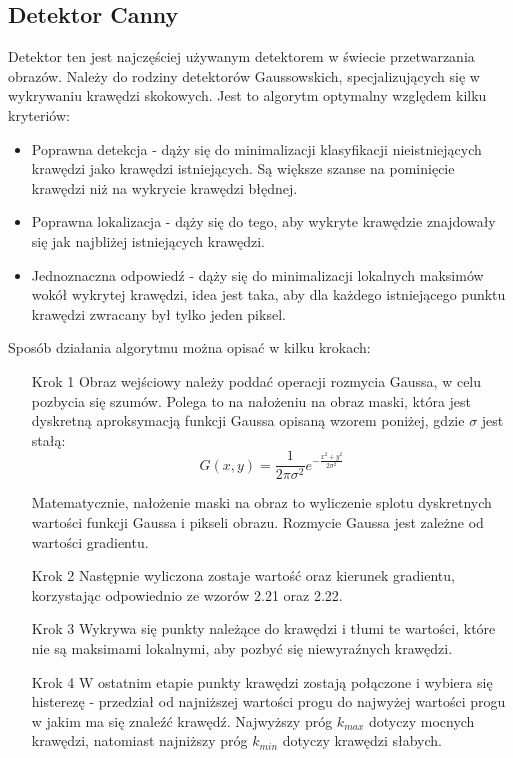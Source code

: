\documentclass[eng,oneside]{mgr}
\begin{document}
\subsection{Detektor Canny}
Detektor ten jest najczęściej używanym detektorem w świecie przetwarzania obrazów. Należy do rodziny detektorów Gaussowskich, specjalizujących się w wykrywaniu krawędzi skokowych. Jest to algorytm optymalny względem kilku kryteriów:
\begin{itemize}
\item Poprawna detekcja - dąży się do minimalizacji klasyfikacji nieistniejących krawędzi jako krawędzi istniejących. Są większe szanse na pominięcie krawędzi niż na wykrycie krawędzi błędnej.
\item Poprawna lokalizacja - dąży się do tego, aby wykryte krawędzie znajdowały się jak najbliżej istniejących krawędzi.
\item Jednoznaczna odpowiedź - dąży się do minimalizacji lokalnych maksimów wokół wykrytej krawędzi, idea jest taka, aby dla każdego istniejącego punktu krawędzi zwracany był tylko jeden piksel.
\end{itemize}
\par Sposób działania algorytmu można opisać w kilku krokach:
\begin{itemize}
\item [Krok 1] Obraz wejściowy należy poddać operacji rozmycia Gaussa, w celu pozbycia się szumów. Polega to na nałożeniu na obraz maski, która jest dyskretną aproksymacją funkcji Gaussa opisaną wzorem poniżej, gdzie $\sigma$ jest stałą:
\begin{equation}
G(x,y) = \frac{1}{2\pi\sigma^2}e^{-\frac{x^2+y^2}{2\sigma^2}}
\end{equation}
\par Matematycznie, nałożenie maski na obraz to wyliczenie splotu dyskretnych wartości funkcji Gaussa i pikseli obrazu\cite{gauss}. Rozmycie Gaussa jest zależne od wartości gradientu.
\item [Krok 2] Następnie wyliczona zostaje wartość oraz kierunek gradientu, korzystając odpowiednio ze wzorów 2.21 oraz 2.22. 
\item [Krok 3] Wykrywa się punkty należące do krawędzi i tłumi te wartości, które nie są maksimami lokalnymi, aby pozbyć się niewyraźnych krawędzi.
\item [Krok 4]  W ostatnim etapie punkty krawędzi zostają połączone i wybiera się histerezę - przedział od najniższej wartości progu do najwyżej wartości progu w jakim ma się znaleźć krawędź. Najwyższy próg $k_{max}$ dotyczy mocnych krawędzi, natomiast najniższy próg $k_{min}$ dotyczy krawędzi słabych.
\end{itemize}
\end{document}
